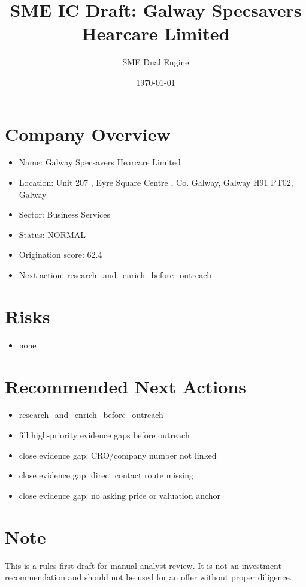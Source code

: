 \documentclass[11pt,a4paper]{article}
\title{SME IC Draft: Galway Specsavers Hearcare Limited}
\author{SME Dual Engine}
\date{\today}
\begin{document}
\maketitle
\section*{Company Overview}
\begin{itemize}[leftmargin=1.4em]
\item Name: Galway Specsavers Hearcare Limited
\item Location: Unit 207 , Eyre Square Centre , Co. Galway, Galway H91 PT02, Galway
\item Sector: Business Services
\item Status: NORMAL
\item Origination score: 62.4
\item Next action: research\_and\_enrich\_before\_outreach
\end{itemize}
\section*{Risks}
\begin{itemize}[leftmargin=1.4em]
\item none
\end{itemize}
\section*{Recommended Next Actions}
\begin{itemize}[leftmargin=1.4em]
\item research\_and\_enrich\_before\_outreach
\item fill high-priority evidence gaps before outreach
\item close evidence gap: CRO/company number not linked
\item close evidence gap: direct contact route missing
\item close evidence gap: no asking price or valuation anchor
\end{itemize}
\section*{Note}
This is a rules-first draft for manual analyst review. It is not an investment
recommendation and should not be used for an offer without proper diligence.
\end{document}
